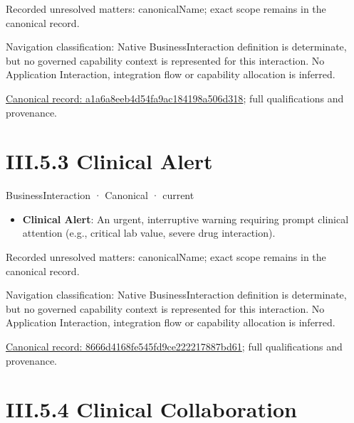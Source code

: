 {\small Recorded unresolved matters: canonicalName; exact scope remains in the canonical record.}\par
{\small Navigation classification: Native BusinessInteraction definition is determinate, but no governed capability context is represented for this interaction. No Application Interaction, integration flow or capability allocation is inferred.}\par
{\footnotesize \href{../../../../continuum/business/business-interaction/a1a6a8eeb4d54fa9ac184198a506d318.md}{Canonical record: a1a6a8eeb4d54fa9ac184198a506d318}; full qualifications and provenance.}\par
\section*{III.5.3 Clinical Alert}
\label{navigation:III.5.3}

\label{element:8666d4168fe545fd9ce222217887bd61}
{\small BusinessInteraction · Canonical · current}\par

\begin{itemize}


\item \textbf{Clinical Alert}: An urgent, interruptive warning requiring prompt clinical attention (e.g., critical lab value, severe drug interaction).

\end{itemize}

{\small Recorded unresolved matters: canonicalName; exact scope remains in the canonical record.}\par
{\small Navigation classification: Native BusinessInteraction definition is determinate, but no governed capability context is represented for this interaction. No Application Interaction, integration flow or capability allocation is inferred.}\par
{\footnotesize \href{../../../../continuum/business/business-interaction/8666d4168fe545fd9ce222217887bd61.md}{Canonical record: 8666d4168fe545fd9ce222217887bd61}; full qualifications and provenance.}\par
\section*{III.5.4 Clinical Collaboration}
\label{navigation:III.5.4}

